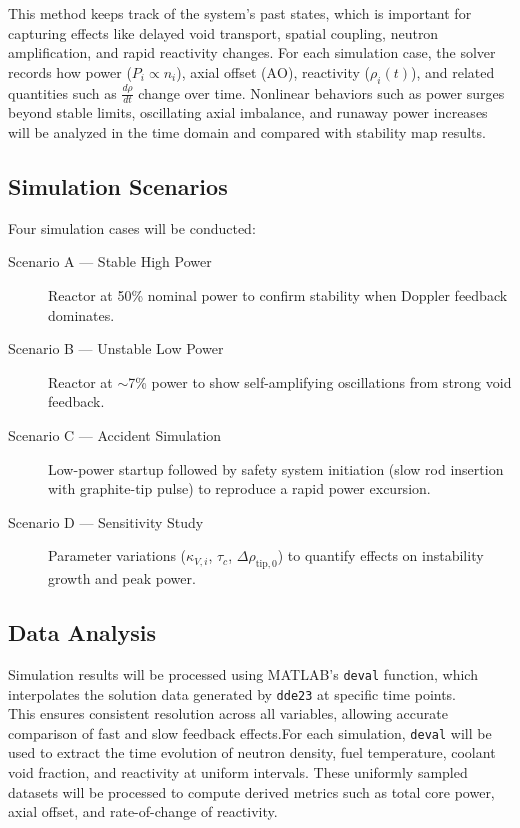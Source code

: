 \documentclass[11pt]{article}
\begin{document}
This method keeps track of the system’s past states, which is important for capturing effects like delayed void transport, spatial coupling, neutron amplification, and rapid reactivity changes. For each simulation case, the solver records how power ($P_i \propto n_i$), axial offset ($\mathrm{AO}$), reactivity ($\rho_i(t)$), and related quantities such as $\frac{d\rho}{dt}$ change over time. Nonlinear behaviors such as power surges beyond stable limits, oscillating axial imbalance, and runaway power increases will be analyzed in the time domain and compared with stability map results.

\subsection{Simulation Scenarios}
Four simulation cases will be conducted:

\begin{description}
\item[Scenario A --- Stable High Power] Reactor at 50\% nominal power to confirm stability when Doppler feedback dominates.
\item[Scenario B --- Unstable Low Power] Reactor at $\sim$7\% power to show self-amplifying oscillations from strong void feedback.
\item[Scenario C --- Accident Simulation] Low-power startup followed by safety system initiation (slow rod insertion with graphite-tip pulse) to reproduce a rapid power excursion.
\item[Scenario D --- Sensitivity Study] Parameter variations ($\kappa_{V,i}$, $\tau_c$, $\Delta\rho_{\mathrm{tip},0}$) to quantify effects on instability growth and peak power.
\end{description}

\subsection{Data Analysis}
Simulation results will be processed using MATLAB’s \texttt{deval} function, which interpolates the solution data generated by \texttt{dde23} at specific time points.\\

This ensures consistent resolution across all variables, allowing accurate comparison of fast and slow feedback effects.For each simulation, \texttt{deval} will be used to extract the time evolution of neutron density, fuel temperature, coolant void fraction, and reactivity at uniform intervals.
These uniformly sampled datasets will be processed to compute derived metrics such as total core power, axial offset, and rate-of-change of reactivity.\\
\end{document}
